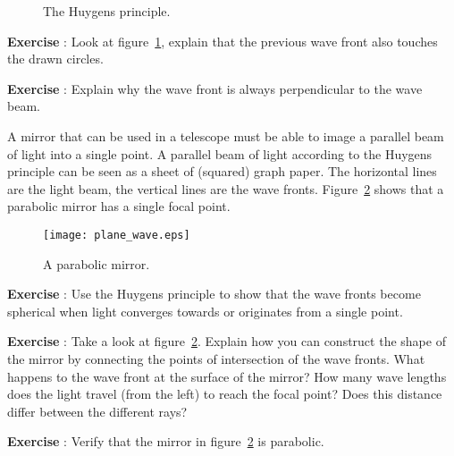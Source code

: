 \begin{figure}
\begin{center}
\caption{The Huygens principle.} \label{fig:huygens}
\end{center}
\end{figure}

\begin{shaded}
\textbf{Exercise \theExercise {}} : Look at figure~\ref{fig:huygens}, explain that the previous wave front also touches the drawn circles.\end{shaded}
\begin{shaded}
\textbf{Exercise \theExercise {}} : Explain why the wave front is always perpendicular to the wave beam.\end{shaded}

A mirror that can be used in a telescope must be able to image a parallel beam of light into a single point. A parallel beam of light according to the Huygens principle can be seen as a sheet of (squared) graph paper. The horizontal lines are the light beam, the vertical lines are the wave fronts. Figure~\ref{fig:plane_wave} shows that a parabolic mirror has a single focal point.

\begin{figure}\begin{center}
\texttt{[image: plane\_wave.eps]}
\caption{A parabolic mirror.}\label{fig:plane_wave}
\end{center}\end{figure}

\begin{shaded}
\textbf{Exercise \theExercise {}} : Use the Huygens principle to show that the wave fronts become spherical when light converges towards or originates from a single point.\end{shaded}
\begin{shaded}
\textbf{Exercise \theExercise {}} : Take a look at figure~\ref{fig:plane_wave}. Explain how you can construct the shape of the mirror by connecting the points of intersection of the wave fronts. What happens to the wave front at the surface of the mirror? How many wave lengths does the light travel (from the left) to reach the focal point? Does this distance differ between the different rays?\end{shaded}
\begin{shaded}
\textbf{Exercise \theExercise {}} : Verify that the mirror in figure~\ref{fig:plane_wave} is parabolic.\end{shaded}

